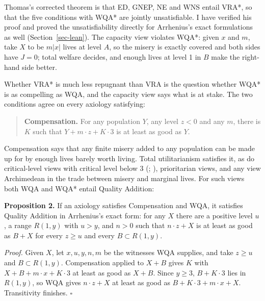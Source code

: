 \documentclass[
  11pt,
  letterpaper,
  DIV=11,
  numbers=noendperiod,
  twoside]{scrartcl}
\begin{document}
Thomas's corrected theorem is that ED, GNEP, NE and WNS entail VRA*, so
that the five conditions with WQA* are jointly unsatisfiable. I have
verified his proof and proved the unsatisfiability directly for
Arrhenius's exact formulations as well (Section~\ref{sec-lean}). The
capacity view violates WQA*: given \(x\) and \(m\), take \(X\) to be
\(m|x|\) lives at level \(A\), so the misery is exactly covered and both
sides have \(J = 0\); total welfare decides, and enough lives at level 1
in \(B\) make the right-hand side better.

Whether VRA* is much less repugnant than VRA is the question whether
WQA* is as compelling as WQA, and the capacity view says what is at
stake. The two conditions agree on every axiology satisfying:

\begin{quote}
\textbf{Compensation.} For any population \(Y\), any level \(z < 0\) and
any \(m\), there is \(K\) such that \(Y + m \cdot z + K \cdot 3\) is at
least as good as \(Y\).
\end{quote}

Compensation says that any finite misery added to any population can be
made up for by enough lives barely worth living. Total utilitarianism
satisfies it, as do critical-level views with critical level below 3
(;
), prioritarian views, and any
view Archimedean in the trade between misery and marginal lives. For
such views both WQA and WQA* entail Quality Addition:

\textbf{Proposition 2.} If an axiology satisfies Compensation and WQA,
it satisfies Quality Addition in Arrhenius's exact form: for any \(X\)
there are a positive level \(u\), a range \(R(1,y)\) with \(u > y\), and
\(n > 0\) such that \(n \cdot z + X\) is at least as good as \(B + X\)
for every \(z \geq u\) and every \(B \subset R(1,y)\).

\emph{Proof.} Given \(X\), let \(x, u, y, n, m\) be the witnesses WQA
supplies, and take \(z \geq u\) and \(B \subset R(1,y)\). Compensation
applied to \(X + B\) gives \(K\) with \(X + B + m \cdot x + K \cdot 3\)
at least as good as \(X + B\). Since \(y \geq 3\), \(B + K \cdot 3\)
lies in \(R(1,y)\), so WQA gives \(n \cdot z + X\) at least as good as
\(B + K \cdot 3 + m \cdot x + X\). Transitivity finishes. \(\square\)
\end{document}
